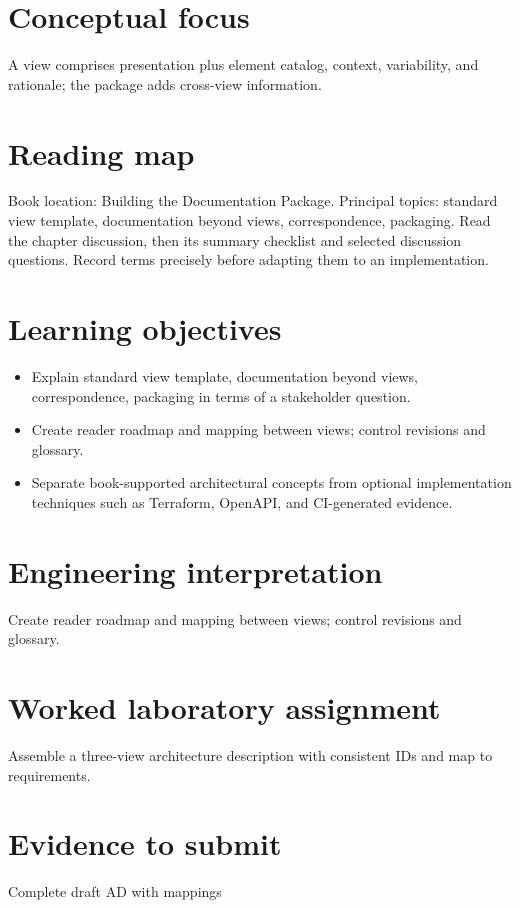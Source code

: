 \documentclass[10pt,letterpaper]{article}
\begin{document}
\DocProvenance
\section{Conceptual focus}
A view comprises presentation plus element catalog, context, variability, and rationale; the package adds cross-view information.

\section{Reading map}
Book location: Building the Documentation Package. Principal topics: standard view template, documentation beyond views, correspondence, packaging. Read the chapter discussion, then its summary checklist and selected discussion questions. Record terms precisely before adapting them to an implementation.

\section{Learning objectives}
\begin{itemize}
\item Explain standard view template, documentation beyond views, correspondence, packaging in terms of a stakeholder question.
\item Create reader roadmap and mapping between views; control revisions and glossary.
\item Separate book-supported architectural concepts from optional implementation techniques such as Terraform, OpenAPI, and CI-generated evidence.
\end{itemize}
\section{Engineering interpretation}
Create reader roadmap and mapping between views; control revisions and glossary.

\section{Worked laboratory assignment}
Assemble a three-view architecture description with consistent IDs and map to requirements.

\section{Evidence to submit}
Complete draft AD with mappings
\end{document}
